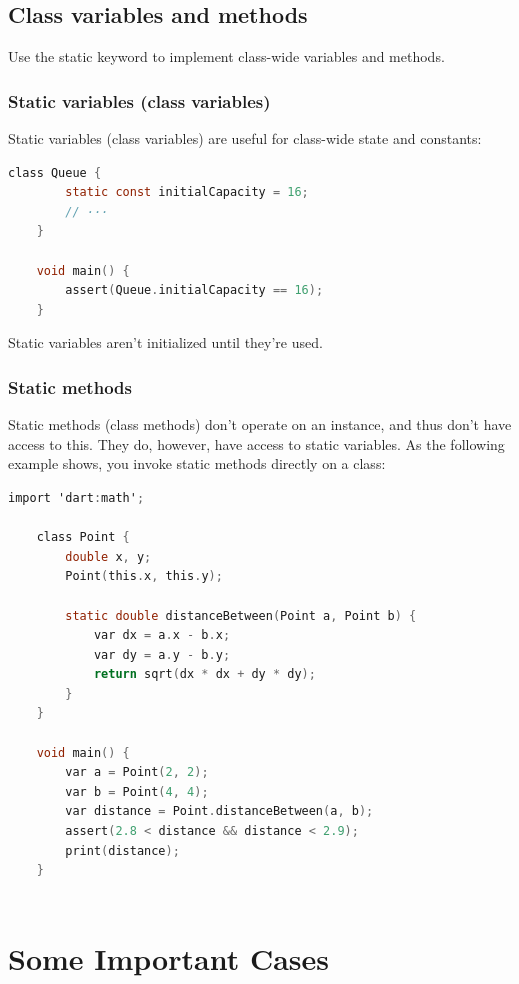 \subsection{Class variables and methods}
Use the static keyword to implement class-wide variables and methods.


\subsubsection{Static variables (class variables)}Static variables (class variables) are useful for class-wide state and constants:
\begin{lstlisting}[language=C]
	class Queue {
		static const initialCapacity = 16;
		// ···
	}
	
	void main() {
		assert(Queue.initialCapacity == 16);
	}
\end{lstlisting}
Static variables aren't initialized until they're used.

\subsubsection{Static methods}Static methods (class methods) don't operate on an instance, and thus don't have access to this. They do, however, have access to static variables. As the following example shows, you invoke static methods directly on a class:
\begin{lstlisting}[language=C]
	import 'dart:math';
	
	class Point {
		double x, y;
		Point(this.x, this.y);
		
		static double distanceBetween(Point a, Point b) {
			var dx = a.x - b.x;
			var dy = a.y - b.y;
			return sqrt(dx * dx + dy * dy);
		}
	}
	
	void main() {
		var a = Point(2, 2);
		var b = Point(4, 4);
		var distance = Point.distanceBetween(a, b);
		assert(2.8 < distance && distance < 2.9);
		print(distance);
	}
	
\end{lstlisting}
\section{Some Important Cases}

